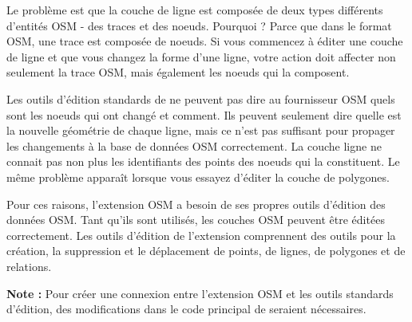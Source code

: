 Le problème est que la couche de ligne est composée de deux types différents d'entités OSM - des traces et des noeuds. Pourquoi ? Parce que dans le format OSM, une trace est composée de noeuds. Si vous commencez à éditer une couche de ligne et que vous changez la forme d'une ligne, votre action doit affecter non seulement la trace OSM, mais également les noeuds qui la composent.

Les outils d'édition standards de \qg ne peuvent pas dire au fournisseur OSM quels sont les noeuds qui ont changé et comment. Ils peuvent seulement dire quelle est la nouvelle géométrie de chaque ligne, mais ce n'est pas suffisant pour propager les changements à la base de données OSM correctement. La couche ligne ne connait pas non plus les identifiants des points des noeuds qui la constituent. Le même problème apparaît lorsque vous essayez d'éditer la couche de polygones.

Pour ces raisons, l'extension OSM a besoin de ses propres outils d'édition des données OSM. Tant qu'ils sont utilisés, les couches OSM peuvent être éditées correctement. Les outils d'édition de l'extension comprennent des outils pour la création, la suppression et le déplacement de points, de lignes, de polygones et de relations.

\textbf{Note :} Pour créer une connexion entre l'extension OSM et les outils standards d'édition, des modifications dans le code principal de \qg seraient nécessaires. 


